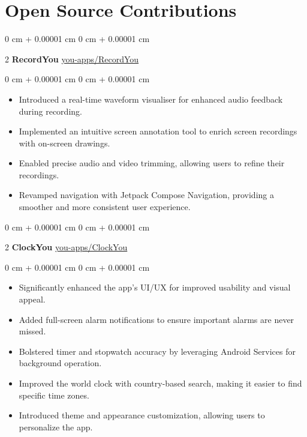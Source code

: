 \documentclass[10pt, letterpaper]{article}
\newenvironment{highlights}{ \begin{itemize}[ topsep=0.10 cm, parsep=0.10 cm, partopsep=0pt,
itemsep=0pt, leftmargin=0 cm + 10pt ] }{ \end{itemize} } %
\newenvironment{onecolentry}{ \begin{adjustwidth}{ 0 cm + 0.00001 cm }{ 0 cm + 0.00001 cm }
}{ \end{adjustwidth} } %
\newenvironment{twocolentry}[2][]{ \onecolentry \def\secondColumn{#2} \setcolumnwidth{\fill, 4.5 cm}
\begin{paracol}{2} }{ \switchcolumn \raggedleft \secondColumn \end{paracol}
\endonecolentry } %
\begin{document}
  \section{Open Source Contributions}
  \begin{twocolentry}
    {\href{https://github.com/you-apps/RecordYou}{you-apps/RecordYou}} \textbf{RecordYou}
  \end{twocolentry}
  \vspace{0.10 cm}
  \begin{onecolentry}
    \begin{highlights}
      \item Introduced a real-time waveform visualiser for enhanced audio feedback
      during recording. \item Implemented an intuitive screen annotation tool to
      enrich screen recordings with on-screen drawings. \item Enabled precise audio
      and video trimming, allowing users to refine their recordings. \item Revamped
      navigation with Jetpack Compose Navigation, providing a smoother and more
      consistent user experience.
    \end{highlights}
  \end{onecolentry}
  \vspace{0.2 cm}
  \begin{twocolentry}
    {\href{https://github.com/you-apps/ClockYou}{you-apps/ClockYou}} \textbf{ClockYou}
  \end{twocolentry}
  \vspace{0.10 cm}
  \begin{onecolentry}
    \begin{highlights}
      \item Significantly enhanced the app's UI/UX for improved usability and visual
      appeal. \item Added full-screen alarm notifications to ensure important
      alarms are never missed. \item Bolstered timer and stopwatch accuracy by leveraging
      Android Services for background operation. \item Improved the world clock
      with country-based search, making it easier to find specific time zones.
      \item Introduced theme and appearance customization, allowing users to personalize
      the app.
    \end{highlights}
  \end{onecolentry}
\end{document}
